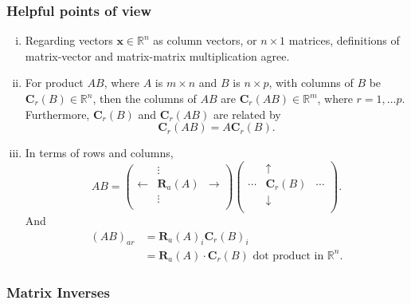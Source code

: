 \documentclass[a4paper]{article}
\begin{document}
\subsubsection{Helpful points of view}
\begin{enumerate}[(i)]
  \item Regarding vectors $ \mathbf{x}\in \mathbb{R}^{n}$ as column
    vectors, or $n\times 1$ matrices, definitions of matrix-vector
    and matrix-matrix multiplication agree.
  \item For product $ AB $, where $ A $ is $m\times n$ and $B$ is $ n
    \times p $, with columns of $ B $ be $ \mathbf{C}_r(B)\in
    \mathbb{R}^{n} $, then the columns of $ AB $ are $
    \mathbf{C}_{r}(AB)\in \mathbb{R}^{m} $, where $r=1,\dots p$.
    Furthermore, $ \mathbf{C}_r(B) $ and $ \mathbf{C}_r(AB) $ are related by
    \[
      \mathbf{C}_r(AB)=A \mathbf{C}_r(B)
    .\]
  \item In terms of rows and columns,
    \[
      AB=
      \begin{pmatrix}
        &\vdots&\\
        \leftarrow&\mathbf{R}_a(A)&\rightarrow\\
        &\vdots&\\
      \end{pmatrix}
      \begin{pmatrix}
        &\uparrow&\\
        \cdots&\mathbf{C}_r(B)&\cdots\\
        &\downarrow&\\
      \end{pmatrix}
    .\]
    And
    \[
      \begin{aligned}
        (AB)_{ar}&=\mathbf{R}_{a}(A)_i \mathbf{C}_r(B)_i\\
        &= \mathbf{R}_a(A) \cdot \mathbf{C}_r(B) \text{ dot product
        in } \mathbb{R}^{n}.
      \end{aligned}
    \]
\end{enumerate}

\subsubsection{Matrix Inverses}
\end{document}
